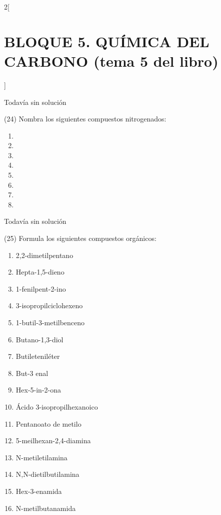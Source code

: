 \documentclass[10pt]{article}
\begin{document}
\begin{multicols}{2}[
  \section{BLOQUE 5. QUÍMICA DEL CARBONO (tema 5 del libro)}
  ]
\begin{solution}[print=false]
  Todavía sin solución
\end{solution}




\begin{exercise}[
    tags    = {},
    topics  = {química, química orgánica, orgánica},
    source  = {FQ 1B MGH 2016, p140, e24},
  ]
  (24) Nombra los siguientes compuestos nitrogenados:
  \begin{enumerate}
    \item {}
    \item {}
    \item {}
    \item {}
    \item {}
    \item {}
    \item {}
    \item {}
  \end{enumerate}
\end{exercise}

\begin{solution}[print=false]
  Todavía sin solución
\end{solution}




\begin{exercise}[
    tags    = {},
    topics  = {química, química orgánica, orgánica},
    source  = {FQ 1B MGH 2016, p140, e25},
  ]
  (25) Formula los siguientes compuestos orgánicos:
  \begin{enumerate}
    \item 2,2-dimetilpentano
    \item Hepta-1,5-dieno
    \item 1-fenilpent-2-ino
    \item 3-isopropilciclohexeno
    \item 1-butil-3-metilbenceno
    \item Butano-1,3-diol
    \item Butileteniléter
    \item But-3 enal
    \item Hex-5-in-2-ona
    \item Ácido 3-isopropilhexanoico
    \item Pentanoato de metilo
    \item 5-meilhexan-2,4-diamina
    \item N-metiletilamina
    \item N,N-dietilbutilamina
    \item Hex-3-enamida
    \item N-metilbutanamida
  \end{enumerate}
\end{exercise}


\end{multicols}
\end{document}
